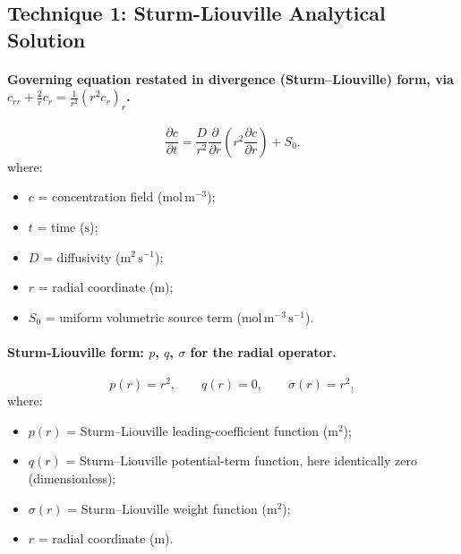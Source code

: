 \documentclass[11pt,a4paper]{article}
\begin{document}
\subsection*{Technique 1: Sturm-Liouville Analytical Solution}

\paragraph{Governing equation restated in divergence (Sturm--Liouville) form, via $c_{rr}+\tfrac2r c_r = \tfrac1{r^2}(r^2c_r)_r$.}

\begin{equation}
\frac{\partial c}{\partial t}
= \frac{D}{r^2}\frac{\partial}{\partial r}\!\left(r^2 \frac{\partial c}{\partial r}\right) + S_0 .
\label{eq:b:pde-divergence}
\end{equation}
\vspace{-0.3em}
\noindent where:

\begin{itemize}[leftmargin=1.6em,itemsep=1pt,topsep=3pt,parsep=0pt]
  \item $c$ = concentration field ($\mathrm{mol\,m^{-3}}$);
  \item $t$ = time ($\mathrm{s}$);
  \item $D$ = diffusivity ($\mathrm{m^{2}\,s^{-1}}$);
  \item $r$ = radial coordinate ($\mathrm{m}$);
  \item $S_0$ = uniform volumetric source term ($\mathrm{mol\,m^{-3}\,s^{-1}}$).
\end{itemize}



\paragraph{Sturm-Liouville form: $p$, $q$, $\sigma$ for the radial operator.}

\begin{equation}
p(r) = r^2, \qquad q(r) = 0, \qquad \sigma(r) = r^2 ,
\label{eq:b:pqsigma}
\end{equation}
\vspace{-0.3em}
\noindent where:

\begin{itemize}[leftmargin=1.6em,itemsep=1pt,topsep=3pt,parsep=0pt]
  \item $p(r)$ = Sturm--Liouville leading-coefficient function ($\mathrm{m^{2}}$);
  \item $q(r)$ = Sturm--Liouville potential-term function, here identically zero (dimensionless);
  \item $\sigma(r)$ = Sturm--Liouville weight function ($\mathrm{m^{2}}$);
  \item $r$ = radial coordinate ($\mathrm{m}$).
\end{itemize}
\end{document}
